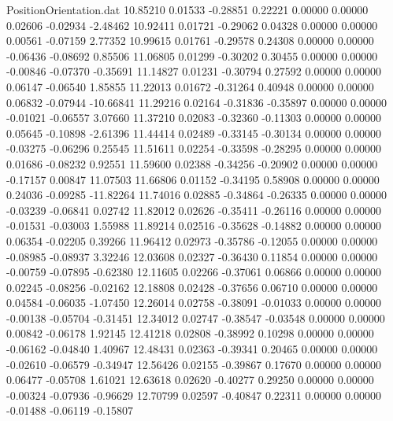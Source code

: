 \begin{filecontents}{PositionOrientation.dat}
  10.85210    0.01533   -0.28851     0.22221    0.00000    0.00000    0.02606   -0.02934   -2.48462
  10.92411    0.01721   -0.29062     0.04328    0.00000    0.00000    0.00561   -0.07159    2.77352
  10.99615    0.01761   -0.29578     0.24308    0.00000    0.00000   -0.06436   -0.08692    0.85506
  11.06805    0.01299   -0.30202     0.30455    0.00000    0.00000   -0.00846   -0.07370   -0.35691
  11.14827    0.01231   -0.30794     0.27592    0.00000    0.00000    0.06147   -0.06540    1.85855
  11.22013    0.01672   -0.31264     0.40948    0.00000    0.00000    0.06832   -0.07944  -10.66841
  11.29216    0.02164   -0.31836    -0.35897    0.00000    0.00000   -0.01021   -0.06557    3.07660
  11.37210    0.02083   -0.32360    -0.11303    0.00000    0.00000    0.05645   -0.10898   -2.61396
  11.44414    0.02489   -0.33145    -0.30134    0.00000    0.00000   -0.03275   -0.06296    0.25545
  11.51611    0.02254   -0.33598    -0.28295    0.00000    0.00000    0.01686   -0.08232    0.92551
  11.59600    0.02388   -0.34256    -0.20902    0.00000    0.00000   -0.17157    0.00847   11.07503
  11.66806    0.01152   -0.34195     0.58908    0.00000    0.00000    0.24036   -0.09285  -11.82264
  11.74016    0.02885   -0.34864    -0.26335    0.00000    0.00000   -0.03239   -0.06841    0.02742
  11.82012    0.02626   -0.35411    -0.26116    0.00000    0.00000   -0.01531   -0.03003    1.55988
  11.89214    0.02516   -0.35628    -0.14882    0.00000    0.00000    0.06354   -0.02205    0.39266
  11.96412    0.02973   -0.35786    -0.12055    0.00000    0.00000   -0.08985   -0.08937    3.32246
  12.03608    0.02327   -0.36430     0.11854    0.00000    0.00000   -0.00759   -0.07895   -0.62380
  12.11605    0.02266   -0.37061     0.06866    0.00000    0.00000    0.02245   -0.08256   -0.02162
  12.18808    0.02428   -0.37656     0.06710    0.00000    0.00000    0.04584   -0.06035   -1.07450
  12.26014    0.02758   -0.38091    -0.01033    0.00000    0.00000   -0.00138   -0.05704   -0.31451
  12.34012    0.02747   -0.38547    -0.03548    0.00000    0.00000    0.00842   -0.06178    1.92145
  12.41218    0.02808   -0.38992     0.10298    0.00000    0.00000   -0.06162   -0.04840    1.40967
  12.48431    0.02363   -0.39341     0.20465    0.00000    0.00000   -0.02610   -0.06579   -0.34947
  12.56426    0.02155   -0.39867     0.17670    0.00000    0.00000    0.06477   -0.05708    1.61021
  12.63618    0.02620   -0.40277     0.29250    0.00000    0.00000   -0.00324   -0.07936   -0.96629
  12.70799    0.02597   -0.40847     0.22311    0.00000    0.00000   -0.01488   -0.06119   -0.15807

\end{filecontents}
